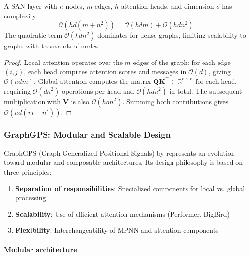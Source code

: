 \begin{proposition}\label{prop:san_complexity}
A SAN layer with $n$ nodes, $m$ edges, $h$ attention heads, and dimension $d$ has complexity:
\begin{equation}
    \mathcal{O}(hd(m + n^2)) = \mathcal{O}(hdm) + \mathcal{O}(hdn^2)
    \label{eq:san_complexity}
\end{equation}
The quadratic term $\mathcal{O}(hdn^2)$ dominates for dense graphs, limiting scalability to graphs with thousands of nodes.
\end{proposition}

\begin{proof}
Local attention operates over the $m$ edges of the graph: for each edge $(i,j)$, each head computes attention scores and messages in $\mathcal{O}(d)$, giving $\mathcal{O}(hdm)$. Global attention computes the matrix $\mathbf{Q}\mathbf{K}^\top \in \mathbb{R}^{n \times n}$ for each head, requiring $\mathcal{O}(dn^2)$ operations per head and $\mathcal{O}(hdn^2)$ in total. The subsequent multiplication with $\mathbf{V}$ is also $\mathcal{O}(hdn^2)$. Summing both contributions gives $\mathcal{O}(hd(m + n^2))$.
\end{proof}

\subsubsection{GraphGPS: Modular and Scalable Design}\label{subsubsec:graphgps_advanced}

GraphGPS (Graph Generalized Positional Signals) by \citet{rampasek2022graphgps} represents an evolution toward modular and composable architectures. Its design philosophy is based on three principles:

\begin{enumerate}
    \item \textbf{Separation of responsibilities}: Specialized components for local vs. global processing
    \item \textbf{Scalability}: Use of efficient attention mechanisms (Performer, BigBird)
    \item \textbf{Flexibility}: Interchangeability of MPNN and attention components
\end{enumerate}

\paragraph{Modular architecture}

